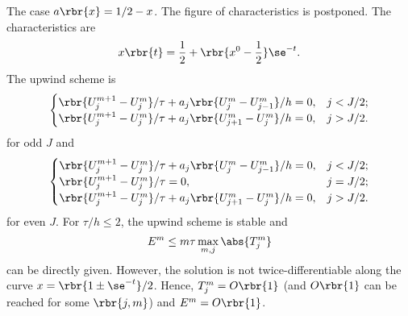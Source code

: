 \documentclass[english, nochinese]{pnote}
\begin{document}
The case $ a \rbr{x} = 1 / 2 - x $. The figure of characteristics is postponed. The characteristics are
\begin{equation}
x \rbr{t} = \frac{1}{2} + \rbr{ x^0 - \frac{1}{2} } \se^{-t}.
\end{equation}
The upwind scheme is
\begin{equation}
\begin{cases}
\rbr{ U_j^{ m + 1 } - U_j^m } / \tau + a_j \rbr{ U_j^m - U_{ j - 1 }^m } / h = 0, & j < J / 2; \\
\rbr{ U_j^{ m + 1 } - U_j^m } / \tau + a_j \rbr{ U_{ j + 1 }^m - U_j^m } / h = 0, & j > J / 2.
\end{cases}
\end{equation}
for odd $J$ and
\begin{equation}
\begin{cases}
\rbr{ U_j^{ m + 1 } - U_j^m } / \tau + a_j \rbr{ U_j^m - U_{ j - 1 }^m } / h = 0, & j < J / 2; \\
\rbr{ U_j^{ m + 1 } - U_j^m } / \tau = 0, & j = J / 2; \\
\rbr{ U_j^{ m + 1 } - U_j^m } / \tau + a_j \rbr{ U_{ j + 1 }^m - U_j^m } / h = 0, & j > J / 2.
\end{cases}
\end{equation}
for even $J$. For $ \tau / h \le 2 $, the upwind scheme is stable and
\begin{equation}
E^m \le m \tau \max_{ m, j } \abs{T_j^m}
\end{equation}
can be directly given. However, the solution is not twice-differentiable along the curve $ x = \rbr{ 1 \pm \se^{-t} } / 2 $. Hence, $ T_j^m = O \rbr{1} $ (and $ O \rbr{1} $ can be reached for some $ \rbr{ j, m } $) and $ E^m = O \rbr{1} $.
\end{document}

